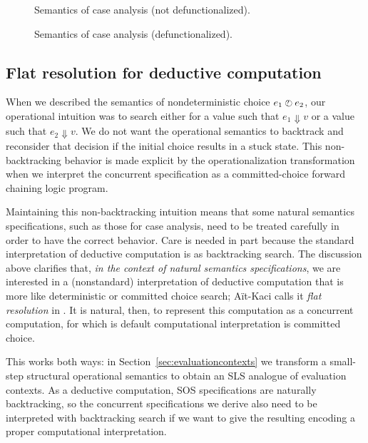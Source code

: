 \begin{figure}
\caption{Semantics of case analysis (not defunctionalized).}
\label{fig:ssos-minml-case-good}
\bigskip
{}
\caption{Semantics of case analysis (defunctionalized).}
\label{fig:ssos-minml-case-good-defun}
\end{figure}


\subsection{Flat resolution for deductive computation}
\label{sec:flatresolution}

When we described the semantics of nondeterministic choice $e_1 \mathbin{\mbox{$\ocircle$\hspace{-7pt}{\footnotesize ?}\hspace{3pt}}}
e_2$, our operational intuition was to search either for a value such
that $e_1 \Downarrow v$ or a value such that $e_2 \Downarrow v$. We do
not want the operational semantics to backtrack and reconsider that
decision if the initial choice results in a stuck state. This
non-backtracking behavior is made explicit by the operationalization
transformation when we interpret the concurrent specification as a
committed-choice forward chaining logic program.

Maintaining this non-backtracking intuition means that some natural
semantics specifications, such as those for case analysis, need to be
treated carefully in order to have the correct behavior. Care is
needed in part because the standard
interpretation of deductive computation is as backtracking search.
The discussion above clarifies that, {\it in the context of natural
  semantics specifications}, we are interested in a (nonstandard) 
interpretation of deductive computation that is more like deterministic
or committed choice search; A{\"i}t-Kaci calls it {\it flat resolution}
 in \cite{aitkaci99warrens}. It is natural, then, to represent this
computation as a concurrent computation, for which is default
computational interpretation is committed choice.

This works both ways: in Section~\ref{sec:evaluationcontexts}
we transform a small-step structural operational semantics to obtain
an SLS analogue of evaluation contexts. As a deductive computation,
SOS specifications are naturally backtracking, so the concurrent
specifications we derive also need to be interpreted with backtracking
search if we want to give the resulting encoding a proper computational
interpretation.


